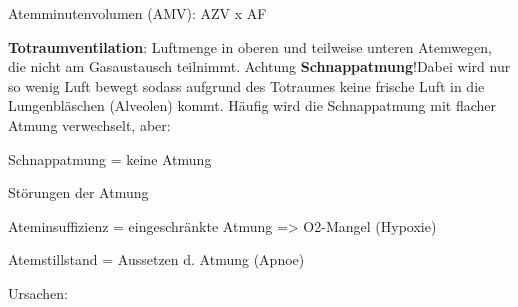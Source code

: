 \documentclass{article}
\newcommand\gT[1]{\textbf{\textup{\textcolor[rgb]{0.0,0.5019608,0.0}{#1}}}}
\begin{document}
{\mdseries
Atemminutenvolumen (AMV): AZV x AF}

{\mdseries
{}\gT{Totraumventilation}:
Luftmenge in oberen  und teilweise unteren Atemwegen, die  nicht am
Gasaustausch teilnimmt. Achtung
\gT{Schnappatmung}!Dabei wird nur
so wenig Luft bewegt sodass aufgrund des Totraumes keine frische Luft
in die Lungenbl\"aschen (Alveolen) kommt. H\"aufig wird die
Schnappatmung mit flacher Atmung verwechselt, aber:}

{\centering\color{black}
Schnappatmung = keine Atmung
\par}

{\mdseries\color[rgb]{0.0,0.0,0.5019608}
St\"orungen der Atmung}

{\mdseries
Ateminsuffizienz = eingeschr\"ankte Atmung ={\textgreater} O2-Mangel
(Hypoxie)   }

{\mdseries
Atemstillstand = Aussetzen d. Atmung (Apnoe)}

{\mdseries\color{black}
Ursachen:}
\end{document}

